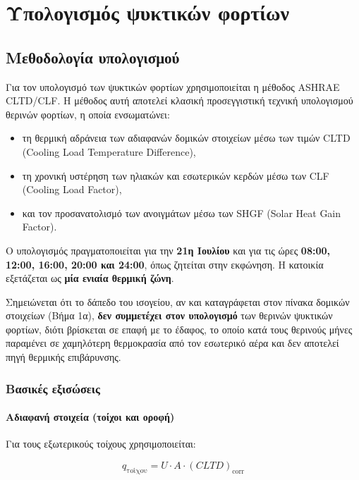 \documentclass[12pt,a4paper]{article}
\begin{document}
\clearpage
\section{Υπολογισμός ψυκτικών φορτίων}

\subsection{Μεθοδολογία υπολογισμού}

Για τον υπολογισμό των ψυκτικών φορτίων χρησιμοποιείται η μέθοδος
\textenglish{ASHRAE CLTD/CLF}. Η μέθοδος αυτή αποτελεί κλασική προσεγγιστική τεχνική
υπολογισμού θερινών φορτίων, η οποία ενσωματώνει:

\begin{itemize}
\item τη θερμική αδράνεια των αδιαφανών δομικών στοιχείων μέσω των τιμών
\textenglish{CLTD} (\textenglish{Cooling Load Temperature Difference}),
\item τη χρονική υστέρηση των ηλιακών και εσωτερικών κερδών μέσω των
\textenglish{CLF} (\textenglish{Cooling Load Factor}),
\item και τον προσανατολισμό των ανοιγμάτων μέσω των
\textenglish{SHGF} (\textenglish{Solar Heat Gain Factor}).
\end{itemize}

Ο υπολογισμός πραγματοποιείται για την \textbf{21η Ιουλίου} και για τις ώρες
\textbf{08:00, 12:00, 16:00, 20:00 και 24:00}, όπως ζητείται στην εκφώνηση. Η
κατοικία εξετάζεται ως \textbf{μία ενιαία θερμική ζώνη}.

Σημειώνεται ότι το δάπεδο του ισογείου, αν και καταγράφεται στον πίνακα δομικών
στοιχείων (Βήμα 1α), \textbf{δεν συμμετέχει στον υπολογισμό} των θερινών ψυκτικών
φορτίων, διότι βρίσκεται σε επαφή με το έδαφος, το οποίο κατά τους θερινούς μήνες
παραμένει σε χαμηλότερη θερμοκρασία από τον εσωτερικό αέρα και δεν αποτελεί πηγή
θερμικής επιβάρυνσης.

\subsubsection{Βασικές εξισώσεις}

\paragraph{Αδιαφανή στοιχεία (τοίχοι και οροφή)}
Για τους εξωτερικούς τοίχους χρησιμοποιείται:

\[
q_{\text{τοίχου}} = U \cdot A \cdot (CLTD)_{\text{corr}}
\]
\end{document}
